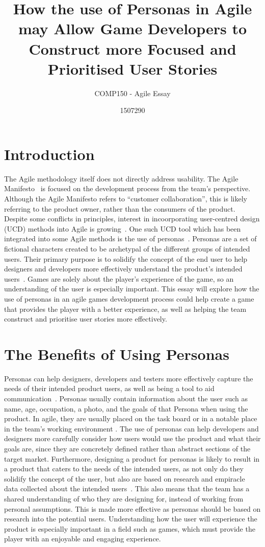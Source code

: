\documentclass{scrartcl}
\title{How the use of Personas in Agile may Allow Game Developers to Construct more Focused and Prioritised User Stories}
\subtitle{COMP150 - Agile Essay}
\author{1507290}
\begin{document}
\maketitle


\section{Introduction}
The Agile methodology itself does not directly address usability. The Agile Manifesto~\cite{manifesto} is focused on the development process from the team's perspective. Although the Agile Manifesto refers to ``customer collaboration'', this is likely referring to the product owner, rather than the consumers of the product. Despite some conflicts in principles, interest in incoorporating user-centred design (UCD) methods into Agile is growing~\cite{haikara:extending}. One such UCD tool which has been integrated into some Agile methods is the use of personas~\cite{caballero:persona}. Personas are a set of fictional characters created to be archetypal of the different groups of intended users. Their primary purpose is to solidify the concept of the end user to help designers and developers more effectively understand the product's intended users~\cite{}. 
Games are solely about the player's experience of the game, so an understanding of the user is especially important. This essay will explore how the use of personas in an agile games development process could help create a game that provides the player with a better experience, as well as helping the team construct and prioritise user stories more effectively.

\section{The Benefits of Using Personas}
Personas can help designers, developers and testers more effectively capture the needs of their intended product users, as well as being a tool to aid communication~\cite{}. Personas usually contain information about the user such as name, age, occupation, a photo, and the goals of that Persona when using the product. In agile, they are usually placed on the task board or in a notable place in the team's working environment \cite{}. The use of personas can help developers and designers more carefully consider how users would use the product and what their goals are, since they are concretely defined rather than abstract sections of the target market. Furthermore, designing a product for personas is likely to result in a product that caters to the needs of the intended users, as not only do they solidify the concept of the user, but also are based on research and empiracle data collected about the intended users~\cite{}. This also means that the team has a shared understanding of who they are designing for, instead of working from personal assumptions. This is made more effective as personas should be based on research into the potential users. Understanding how the user will experience the product is especially important in a field such as games, which must provide the player with an enjoyable and engaging experience.
\end{document}
